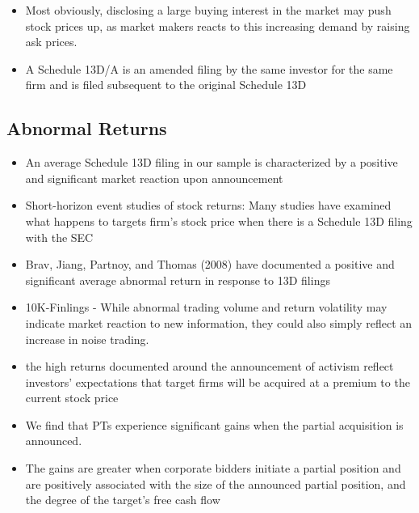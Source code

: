 \documentclass[12pt]{article}
\begin{document}
\begin{itemize}
        \item Most obviously, disclosing a large buying interest in the market may push stock prices up, as market makers reacts to this increasing demand by raising ask prices. \citep{Giglia2018}
        
        \item A Schedule 13D/A is an amended filing by the same investor for the same firm and is filed subsequent to the original Schedule 13D \citep{Klein2009}
    \end{itemize}

\subsection{Abnormal Returns}
    \begin{itemize}
        \item An average Schedule 13D filing in our sample is characterized by a positive and significant market reaction upon announcement \citep{Collin-Dufresne2015}

        \item Short-horizon event studies of stock returns: Many studies have examined what happens to targets firm’s stock price when there is a Schedule 13D filing with the SEC \citep{CoffeeJr.2014}

        \item Brav, Jiang, Partnoy, and Thomas (2008) have documented a positive and significant average abnormal return in response to 13D filings \citep{Brigida2012}

        \item 10K-Finlings - While abnormal trading volume and return volatility may indicate market reaction to new information, they could also simply reflect an increase in noise trading. \citep{You2009}

        \item the high returns documented around the announcement of activism reflect investors’ expectations that target firms will be acquired at a premium to the current stock price \citep{Greenwood2009}

        \item We find that PTs experience significant gains when the partial acquisition is announced. \citep{Akhigbe2007}
        
        \item The gains are greater when corporate bidders initiate a partial position and are positively associated with the size of the announced partial position, and the degree of the target’s free cash flow \citep{Akhigbe2007}


\end{itemize}
\end{document}
